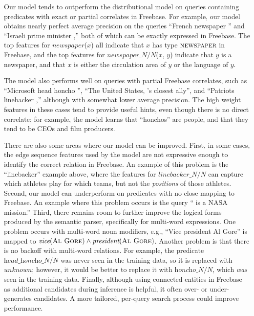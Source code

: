 \documentclass[11pt]{article}
\newcommand{\blank}{\underline{\hspace{.5cm}}}
\newcommand{\lexicalpredicate}[1]{\ensuremath{\textit{#1}}}
\newcommand{\formalpredicate}[1]{\ensuremath{\textsc{#1}}}
\newcommand{\entity}[1]{\ensuremath{\textsc{#1}}}
\begin{document}
Our model tends to outperform the distributional model on queries
containing predicates with exact or partial correlates in
Freebase. For example, our model obtains nearly perfect average
precision on the queries ``French newspaper \blank{}'' and ``Israeli
prime minister \blank{},'' both of which can be exactly expressed in
Freebase.  The top features for \lexicalpredicate{newspaper}($x$) all
indicate that $x$ has type \formalpredicate{newspaper} in Freebase,
and the top features for \lexicalpredicate{newspaper\_N/N}($x$, $y$)
indicate that $y$ is a newspaper, and that $x$ is either the
circulation area of $y$ or the language of $y$.

The model also performs well on queries with partial Freebase
correlates, such as ``Microsoft head honcho \blank{}'', ``The United
States, \blank{}'s closest ally'', and ``Patriots linebacker
\blank{},'' although with somewhat lower average precision. The high
weight features in these cases tend to provide useful hints, even
though there is no direct correlate; for example, the model learns
that ``honchos'' are people, and that they tend to be CEOs and film
producers.

There are also some areas where our model can be improved. First, in
some cases, the edge sequence features used by the model are not
expressive enough to identify the correct relation in Freebase. An
example of this problem is the ``linebacker'' example above, where the
features for \lexicalpredicate{linebacker\_N/N} can capture which athletes
play for which teams, but not the \emph{positions} of those
athletes. Second, our model can underperform on predicates with no
close mapping to Freebase. An example where this problem occurs is the
query ``\blank{} is a NASA mission.'' Third, there remains room to
further improve the logical forms produced by the semantic parser,
specifically for multi-word expressions. One problem occurs with
multi-word noun modifiers, e.g., ``Vice president Al Gore'' is mapped
to $\lexicalpredicate{vice}(\entity{Al Gore}) \land
\lexicalpredicate{president}(\entity{Al Gore})$. Another problem is that
there is no backoff with multi-word relations. For example, the
predicate \lexicalpredicate{head\_honcho\_N/N} was never seen in the training
data, so it is replaced with \lexicalpredicate{unknown}; however, it would be
better to replace it with \lexicalpredicate{honcho\_N/N}, which \emph{was}
seen in the training data. Finally, although using connected entities
in Freebase as additional candidates during inference is helpful, it
often over- or under-generates candidates. A more tailored, per-query
search process could improve performance.
\end{document}
